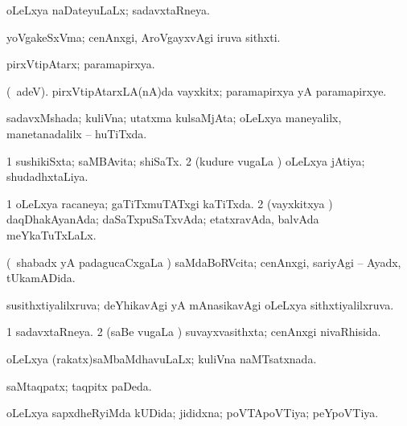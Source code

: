 {{{\bentry
{} 
\gl{\gu}
\expl{}
\bmng
oLeLxya naDateyuLaLx; sadavxtaRneya. 
\emng
\eentry

\bentry
{} 
\gl{\nA}
\expl{}
\bmng
yoVgakeSxVma; cenAnxgi, AroVgayxvAgi iruva sithxti. 
\emng
\eentry

\bentry
{} 
\gl{\gu}
\expl{}
\bmng
pirxVtipAtarx; paramapirxya. 
\emng
\eentry

\bentry
{} 
\gl{\nA}
\expl{}
\bmng
(\bava\ adeV). pirxVtipAtarxLA(nA)da vayxkitx; paramapirxya yA paramapirxye. 
\emng
\eentry

\bentry
{} 
\gl{\gu}
\expl{}
\bmng
sadavxMshada; kuliVna; utatxma kulsaMjAta; oLeLxya maneyalilx, manetanadalilx -- huTiTxda. 
\emng
\eentry

\bentry
{} 
\gl{\gu}
\expl{}
\bmng
\bnum
\num{1} sushikiSxta; saMBAvita; shiSaTx. 
\num{2} (kudure \mo vugaLa \vi) oLeLxya jAtiya; shudadhxtaLiya. 
\enum
\emng
\eentry

\bentry
{} 
\gl{\gu}
\expl{}
\bmng
\bnum
\num{1} oLeLxya racaneya; gaTiTxmuTATxgi kaTiTxda. 
\num{2} (vayxkitxya \vi) daqDhakAyanAda; daSaTxpuSaTxvAda; etatxravAda, balvAda meYkaTuTxLaLx. 
\enum
\emng
\eentry

\bentry
{} 
\gl{\gu}
\expl{}
\bmng
(\kanmu\ shabadx yA padagucaCxgaLa \vi) saMdaBoRVcita; cenAnxgi, sariyAgi -- Ayadx, tUkamADida. 
\emng
\eentry

\bentry
{} 
\gl{\gu}
\expl{}
\bmng
susithxtiyalilxruva; deYhikavAgi yA mAnasikavAgi oLeLxya sithxtiyalilxruva. 
\emng
\eentry

\bentry
{} 
\gl{\gu}
\expl{}
\bmng
\bnum
\num{1} sadavxtaRneya. 
\num{2} (saBe \mo vugaLa \vi) suvayxvasithxta; cenAnxgi nivaRhisida. 
\enum
\emng
\eentry

\bentry
{} 
\gl{\gu}
\expl{}
\bmng
oLeLxya (rakatx)saMbaMdhavuLaLx; kuliVna naMTsatxnada. 
\emng
\eentry

\bentry
{} 
\gl{\gu}
\expl{}
\bmng
saMtaqpatx; taqpitx paDeda. 
\emng
\eentry

\bentry
{} 
\gl{\gu}
\expl{}
\bmng
oLeLxya sapxdheRyiMda kUDida; jididxna; poVTApoVTiya; peYpoVTiya. 
\emng
\eentry

}}}
